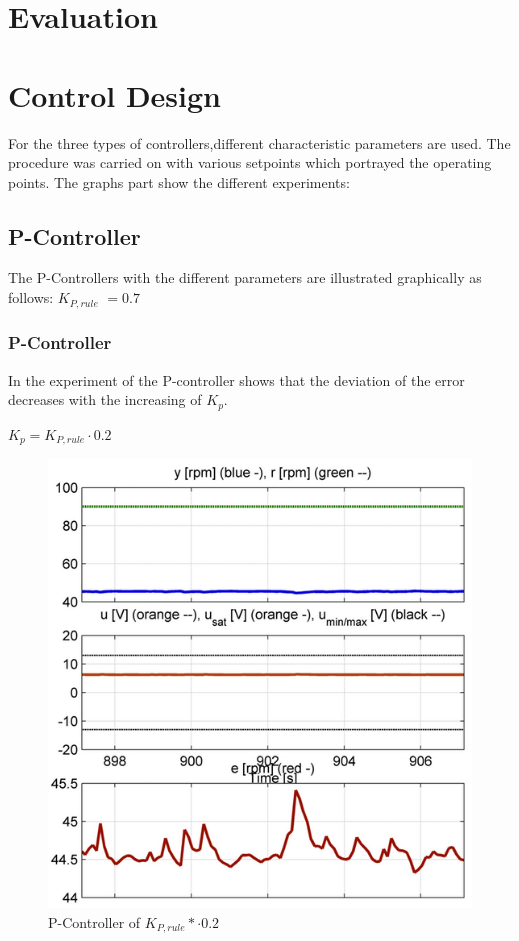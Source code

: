 \section{Evaluation}
\section{Control Design}

For the three types of controllers,different characteristic parameters are used. The procedure was carried on with various setpoints which portrayed the operating points. The graphs part show the different experiments:
\subsection{P-Controller}
The P-Controllers with the different parameters are illustrated graphically as follows: \textbf{$K_{P,rule}$} $= 0.7$
\subsubsection{P-Controller}
In the experiment of the P-controller shows that the deviation of the error decreases with the increasing of $K_{p}$.
\begin{center}
{$K_{p}= K_{P,rule}\cdot{0.2}$}
\end{center}

\begin{figure}[H]
\begin{center}
\includegraphics[width=0.6\linewidth]{images/general/P/p_controller02}
\end{center}
\caption{P-Controller of $ K_{P,rule}*\cdot{0.2}$}
\label{fig:p_controller2}
\end{figure}

